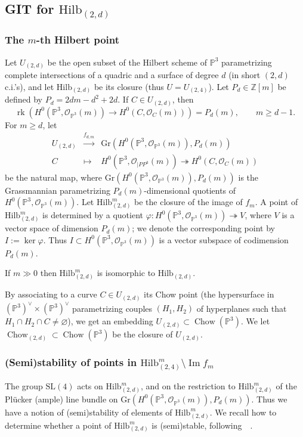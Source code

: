 \documentclass[11pt]{amsart}
\numberwithin{equation}{section}
\theoremstyle{plain}
\theoremstyle{remark}
\theoremstyle{definition}
\newcommand{\Hilb}{\mathrm{Hilb}}
\newcommand{\SL}{\mathrm{SL}}
\newcommand{\im}{\operatorname{Im}}
\newcommand{\Gr}{\mathrm{Gr}}
\newcommand{\cO}{{\mathscr O}}
\newcommand{\es}{\varnothing}
\newcommand{\lra}{\longrightarrow}
\newcommand{\PP}{{\mathbb P}}
\newcommand{\ZZ}{{\mathbb Z}}
\DeclareMathOperator{\Chow}{Chow}
\DeclareMathOperator{\rk}{rk}
\begin{document}
\subsection{GIT for $\Hilb_{(2,d)}$}
%
\subsubsection{The $m$-th Hilbert point}\label{subsubsec:mHilbert}
Let $U_{(2,d)}$ be the open  subset of the Hilbert scheme of $\PP^3$  parametrizing complete intersections of a quadric and a  surface of degree $d$ (in short $(2,d)$ c.i.'s), and let 
$\Hilb_{(2,d)}$ be its closure (thus $U=U_{(2,4)}$).  
Let $P_d\in\ZZ[m]$ be defined by $P_d=2dm-d^2+2d$. If $C\in U_{(2,d)}$, then 
%
\begin{equation*}
%
\rk(H^0(\PP^3,\cO_{\PP^3}(m))\lra H^0(C,\cO_{C}(m)))=P_d(m),\qquad m\ge d-1.
%
\end{equation*}
%
For $m\ge d$, let  
%
\begin{equation}
%
\begin{matrix}
%
U_{(2,d)} & \overset{f_{d,m}}{\lra} & \Gr(H^0(\PP^3,\cO_{\PP^3}(m)),P_d(m)) \\
%
C & \mapsto & H^0(\PP^3,\cO_{|PP^3}(m))\twoheadrightarrow H^0(C,\cO_{C}(m))
%
\end{matrix}
%
\end{equation}
%
be the natural map, where $\Gr(H^0(\PP^3,\cO_{\PP^3}(m)),P_d(m))$ is the Grassmannian parametrizing $P_d(m)$-dimensional quotients of $H^0(\PP^3,\cO_{\PP^3}(m))$. Let $\Hilb^m_{(2,d)}$
 be the closure of the image of $f_m$. A point of $\Hilb^m_{(2,d)}$ is determined by a quotient $\varphi\colon H^0(\PP^3,\cO_{\PP^3}(m))\twoheadrightarrow  V$, where $V$ is a vector space of dimension $P_d(m)$;  we denote the corresponding point by $I:=\ker\varphi$. 
 Thus $I\subset H^0(\PP^3,\cO_{\PP^3}(m))$ is a vector subspace of codimension $P_d(m)$.

 
 If $m\gg 0$ then  $\Hilb^m_{(2,d)}$ is isomorphic to $\Hilb_{(2,d)}$.
 
 By associating to a curve  $C\in U_{(2,d)}$ its Chow point (the hypersurface in $(\PP^3)^{\vee}\times (\PP^3)^{\vee}$ parametrizing couples $(H_1,H_2)$ of hyperplanes such that $H_1\cap H_2\cap C\not=\es$), we get an embedding $U_{(2,d)}\subset \Chow(\PP^3)$. We let    $\Chow_{(2,d)}\subset  \Chow(\PP^3)$ be the closure of $U_{(2,d)}$.
 
 

%
\subsubsection{(Semi)stability of points in $\Hilb^m_{(2,4)}\setminus \im f_m$}
%
The group $\SL(4)$ acts on  $\Hilb^m_{(2,d)}$, and on the restriction  to  $\Hilb^m_{(2,d)}$ of the Pl\"ucker (ample) line bundle on $\Gr(H^0(\PP^3,\cO_{\PP^3}(m)),P_d(m))$. Thus we have a notion of (semi)stability of elements of  $\Hilb^m_{(2,d)}$. 
We recall how to determine whether a point of  $\Hilb^m_{(2,d)}$ is (semi)stable, following~~\cite{hhl-stab}.
\end{document}
